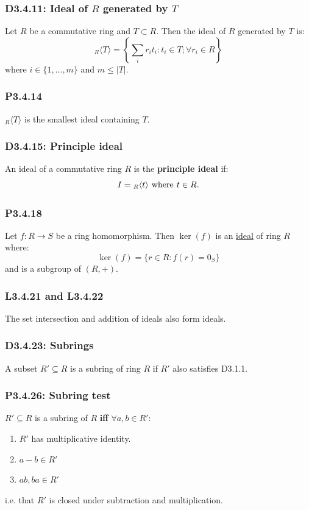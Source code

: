 \documentclass{article}
\begin{document}
\begin{multicols*}{3}
\subsubsection*{D3.4.11: Ideal of $R$ generated by $T$}
Let $R$ be a commutative ring and $T\subset R$.
Then the ideal of $R$ generated by $T$ is:
$${}_R\langle T\rangle=\left\{\sum_i r_i t_i
:t_i\in T;\forall r_i\in R\right\}$$
where $i\in\{1,\dots,m\}$ and $m\leq|T|$.

\subsubsection*{P3.4.14}
${}_R\langle T\rangle$ is the smallest ideal
containing $T$.

\subsubsection*{D3.4.15: Principle ideal}
An ideal of a commutative ring $R$ is the
\textbf{principle ideal} if:
$$I={}_R\langle t\rangle\hspace{0.05in}\text{where}
\hspace{0.05in}t\in R.$$

\subsubsection*{P3.4.18}
Let $f:R\rightarrow S$ be a ring homomorphism.
Then $\ker(f)$ is an \underline{ideal} of ring $R$ where:
$$\ker(f)=\{r\in R:f(r)=0_S\}$$
and is a subgroup of $(R,+)$.

\subsubsection*{L3.4.21 and L3.4.22}
The set intersection and addition of ideals also form ideals.

\subsubsection*{D3.4.23: Subrings}
A subset $R'\subseteq R$ is a subring of ring $R$ if
$R'$ also satisfies D3.1.1.

\subsubsection*{P3.4.26: Subring test}
$R'\subseteq R$ is a subring of $R$ \textbf{if{}f}
$\forall a,b\in R'$:
\begin{enumerate}
    \item $R'$ has multiplicative identity.
    \item $a-b\in R'$
    \item $ab,ba\in R'$
\end{enumerate}
i.e. that $R'$ is closed under subtraction
and multiplication.


\end{multicols*}
\end{document}
